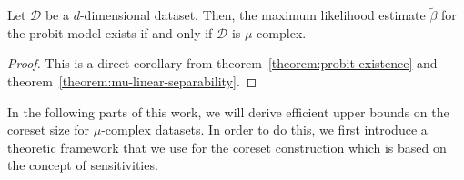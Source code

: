 \begin{theorem}
    Let $\mathcal{D}$ be a $d$-dimensional dataset.
    Then, the maximum likelihood estimate $\tilde\beta$ for the probit
    model exists if and only if $\mathcal{D}$ is $\mu$-complex.
\end{theorem}
\begin{proof}
    This is a direct corollary from theorem~\ref{theorem:probit-existence}
    and theorem~\ref{theorem:mu-linear-separability}.
\end{proof}

In the following parts of this work, we will derive efficient upper
bounds on the coreset size for $\mu$-complex datasets.
In order to do this, we first introduce a theoretic
framework that we use for the coreset construction which
is based on the concept of sensitivities.